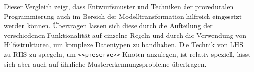 Dieser Vergleich zeigt, dass Entwurfsmuster und Techniken der prozeduralen Programmierung auch im
Bereich der Modelltransformation hilfreich eingesetzt werden können. Übertragen lassen sich diese
durch die Aufteilung der verschiedenen Funktionalität auf einzelne Regeln und durch die Verwendung
von Hilfsstrukturen, um komplexe Datentypen zu handhaben. Die Technik von LHS zu RHS zu spiegeln, um
\texttt{<<preserve>>} Knoten anzulegen, ist relativ speziell, lässt sich aber auch auf ähnliche
Mustererkennungsprobleme übertragen.

